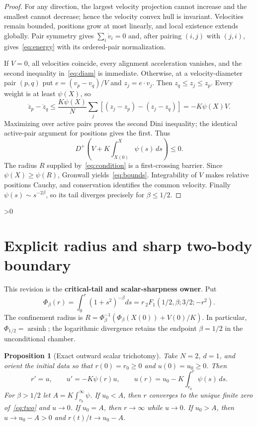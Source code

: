 \documentclass[10pt]{article}
\providecommand{\CRevisionRound}{2}
\newtheorem{proposition}{Proposition}
\newcommand{\Dini}{D^{+}}
\begin{document}
\begin{proof}
For any direction, the largest velocity projection cannot increase and the
smallest cannot decrease; hence the velocity convex hull is invariant.
Velocities remain bounded, positions grow at most linearly, and local
existence extends globally.  Pair symmetry gives $\sum_i\dot v_i=0$ and,
after pairing $(i,j)$ with $(j,i)$, gives~\eqref{eq:energy} with its ordered-pair
normalization.

If $V=0$, all velocities coincide, every alignment acceleration vanishes, and
the second inequality in~\eqref{eq:diam} is immediate.  Otherwise, at a
velocity-diameter pair $(p,q)$ put $e=(v_p-v_q)/V$ and $z_j=e\cdot v_j$.  Then
$z_q\le z_j\le z_p$.  Every weight is at least $\psi(X)$, so
\[
 \dot z_p-\dot z_q\le\frac{K\psi(X)}N
 \sum_j[(z_j-z_p)-(z_j-z_q)]=-K\psi(X)V.
\]
Maximizing over active pairs proves the second Dini inequality; the identical
active-pair argument for positions gives the first.  Thus
\[
 \Dini\left(V+K\int_{X(0)}^X\psi(s)\,ds\right)\le0.
\]
The radius $R$ supplied by~\eqref{eq:condition} is a first-crossing barrier.
Since $\psi(X)\ge\psi(R)$, Gronwall yields~\eqref{eq:bounds}.  Integrability of
$V$ makes relative positions Cauchy, and conservation identifies the common
velocity.  Finally $\psi(s)\sim s^{-2\beta}$, so its tail diverges precisely
for $\beta\le1/2$.
\end{proof}

\ifnum\CRevisionRound>0
\section{Explicit radius and sharp two-body boundary}
This revision is the \textbf{critical-tail and scalar-sharpness owner}.  Put
\[
 \Phi_\beta(r)=\int_0^r(1+s^2)^{-\beta}ds
 =r\,{}_2F_1(1/2,\beta;3/2;-r^2).
\]
The confinement radius is
$R=\Phi_\beta^{-1}(\Phi_\beta(X(0))+V(0)/K)$.  In particular,
$\Phi_{1/2}=\operatorname{arsinh}$; the logarithmic divergence retains the
endpoint $\beta=1/2$ in the unconditional chamber.

\begin{proposition}[Exact outward scalar trichotomy]\label{prop:sharp}
Take $N=2$, $d=1$, and orient the initial data so that
$r(0)=r_0\ge0$ and $u(0)=u_0\ge0$.  Then
\begin{equation}\label{eq:two}
 r'=u,\qquad u'=-K\psi(r)u,\qquad
 u(r)=u_0-K\int_{r_0}^{r}\psi(s)\,ds.
\end{equation}
For $\beta>1/2$ let $A=K\int_{r_0}^{\infty}\psi$.  If $u_0<A$, then
$r$ converges to the unique finite zero of~\eqref{eq:two} and $u\to0$.
If $u_0=A$, then $r\to\infty$ while $u\to0$.  If $u_0>A$, then
$u\to u_0-A>0$ and $r(t)/t\to u_0-A$.
\end{proposition}
\end{document}
